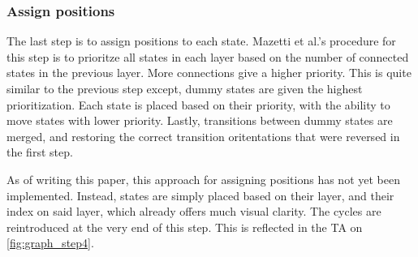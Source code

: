 

\subsubsection{Assign positions}
The last step is to assign positions to each state.
Mazetti et al.'s procedure for this step is to prioritze all states in each layer based on the number of connected states in the previous layer.
More connections give a higher priority. This is quite similar to the previous step except, dummy states are given the highest prioritization.
Each state is placed based on their priority, with the ability to move states with lower priority.
Lastly, transitions between dummy states are merged, and restoring the correct transition oritentations that were reversed in the first step. \cite{Mazetti2012}

As of writing this paper, this approach for assigning positions has not yet been implemented. Instead, states are simply placed based on their layer, and their index on said layer, which already offers much visual clarity. The cycles are reintroduced at the very end of this step. This is reflected in the TA on \cref{fig:graph_step4}.


